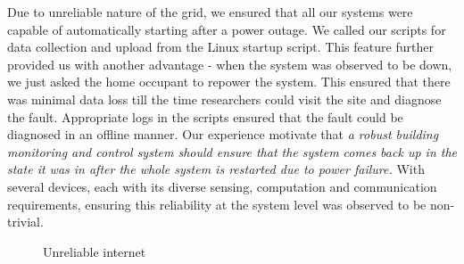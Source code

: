 \documentclass[10pt]{sensys-proc}
\begin{document}
\noindent Due to unreliable nature of the grid, we ensured that all our systems were capable of automatically starting after a power outage. We called our scripts for data collection and upload from the Linux startup script. This feature further provided us with another advantage - when the system was observed to be down, we just asked the home occupant to repower the system. This ensured that there was minimal data loss till the time researchers could visit the site and diagnose the fault. Appropriate logs in the scripts ensured that the fault could be diagnosed in an offline manner. Our experience motivate that \emph{a robust building monitoring and control system should ensure that the system comes back up in the state it was in after the whole system is restarted due to power failure.} With several devices, each with its diverse sensing, computation and communication requirements, ensuring this reliability at the system level was observed to be non-trivial.

\begin{figure}
        \vspace{-3mm}
  \caption{Unreliable internet}
  
      \label{fig:unreliable_internet}
\end{figure}
\end{document}
